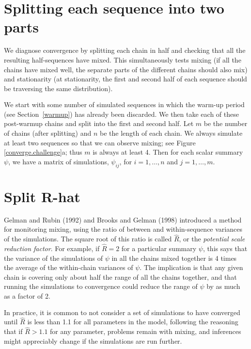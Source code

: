 \documentclass[11pt]{article}
\begin{document}
\section{Splitting each sequence into two parts}
\label{splitting}

We diagnose convergence by splitting each chain in half and checking that all the resulting half-sequences have
mixed.  This simultaneously tests mixing (if all the chains have
mixed well, the separate parts of the different chains should also
mix) and stationarity (at stationarity, the first and second half of
each sequence should be traversing the same distribution).

We start with some number of simulated sequences in which the warm-up period (see Section~\ref{warmup}) has already been discarded.  We then take each of these post-warmup chains and split into the first and second half.  Let $m$ be the number of chains (after splitting) and $n$ be the length of each chain.  We always simulate at least two sequences so that we can observe mixing; see Figure \ref{converge.challenge}a; thus $m$ is always at least 4.  Then for each scalar summary $\psi$, we have a matrix of simulations, $\psi_{ij}$, for $i=1,\dots,n$ and $j=1,\ldots,m$.

\section{Split R-hat}\label{split}

Gelman and Rubin (1992) and Brooks and Gelman (1998) introduced a method for monitoring mixing, using the ratio of between and within-sequence variances of the simulations.  The square root of this ratio is called $\widehat{R}$, or the {\em potential scale reduction factor}.  For example, if $\widehat{R}=2$ for a particular summary $\psi$, this says that the variance of the simulations of $\psi$ in all the chains mixed together is 4 times the average of the within-chain variances of $\psi$.  The implication is that  any given chain is covering only about half the range of all the chains together, and that running the simulations to convergence could reduce the range of $\psi$ by as much as a factor of 2.

In practice, it is common to not consider a set of simulations to have converged until $\widehat{R}$ is less than 1.1 for all parameters in the model, following the reasoning that if $\widehat{R}>1.1$ for any parameter, problems remain with mixing, and inferences might appreciably change if the simulations are run further.
\end{document}
